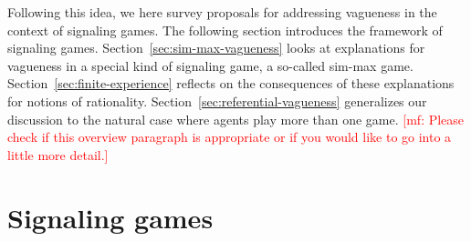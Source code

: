 \documentclass[a4paper]{article}
\newcommand{\mf}[1]{\textcolor{Red}{[mf: #1]}}
\begin{document}
Following this idea, we here survey proposals for addressing vagueness in the context of signaling games.
The following section introduces the framework of signaling games.
Section~\ref{sec:sim-max-vagueness} looks at explanations for vagueness in a special kind of signaling game, a so-called sim-max game.
Section~\ref{sec:finite-experience} reflects on the consequences of these explanations for notions of rationality.
Section~\ref{sec:referential-vagueness} generalizes our discussion to the natural case where agents play more than one game. 
\mf{Please check if this overview paragraph is appropriate or if you would like to go into a little more detail.}


\section{Signaling games}
\label{sec:signaling-games}
\end{document}
